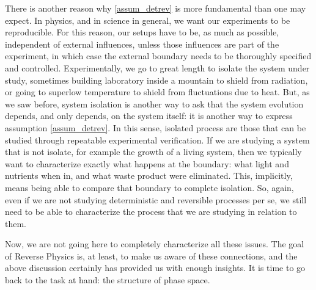 There is another reason why \ref{assum_detrev} is more fundamental than one may expect. In physics, and in science in general, we want our experiments to be reproducible. For this reason, our setups have to be, as much as possible, independent of external influences, unless those influences are part of the experiment, in which case the external boundary needs to be thoroughly specified and controlled. Experimentally, we go to great length to isolate the system under study, sometimes building laboratory inside a mountain to shield from radiation, or going to superlow temperature to shield from fluctuations due to heat. But, as we saw before, system isolation is another way to ask that the system evolution depends, and only depends, on the system itself: it is another way to express assumption \ref{assum_detrev}. In this sense, isolated process are those that can be studied through repeatable experimental verification. If we are studying a system that is not isolate, for example the growth of a living system, then we typically want to characterize exactly what happens at the boundary: what light and nutrients when in, and what waste product were eliminated. This, implicitly, means being able to compare that boundary to complete isolation. So, again, even if we are not studying deterministic and reversible processes per se, we still need to be able to characterize the process that we are studying in relation to them.

Now, we are not going here to completely characterize all these issues. The goal of Reverse Physics is, at least, to make us aware of these connections, and the above discussion certainly has provided us with enough insights. It is time to go back to the task at hand: the structure of phase space.